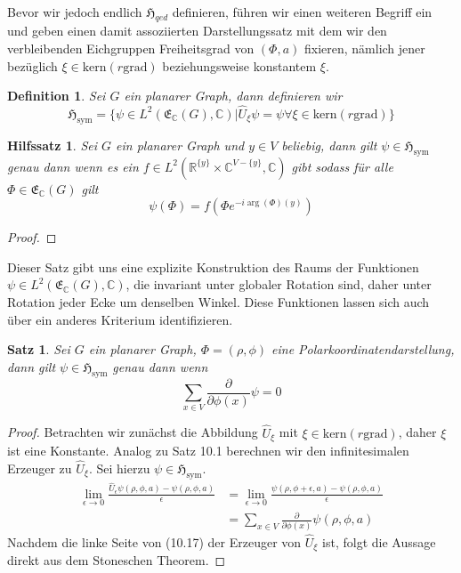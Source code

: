 \documentclass[11pt,a4paper,leqno]{report}
\newtheorem{proposition}{Satz}[chapter]
\newtheorem{lemma}[theorem]{Hilfssatz}
\newtheorem{definition}[theorem]{Definition}
\numberwithin{equation}{chapter}
\begin{document}
\\
Bevor wir jedoch endlich $\mathfrak{H}_{qed}$ definieren, f\"uhren wir einen weiteren Begriff ein und geben einen damit assoziierten Darstellungssatz mit dem wir den verbleibenden Eichgruppen Freiheitsgrad von $(\Phi, a)$ fixieren, nämlich jener  bez\"uglich $\xi\in \text{kern}(r\text{grad})$ beziehungsweise konstantem $\xi$.
\begin{definition}
	Sei $G$ ein planarer Graph, dann definieren wir
	\begin{equation}
		\mathfrak{H}_{\text{sym}}=\{\psi\in L^2(\mathfrak{E}_\mathbb{C}(G), \mathbb{C})| \hat{U}_\xi\psi=\psi \forall \xi\in \text{kern}(r\text{grad})\}
	\end{equation}
\end{definition}
\begin{lemma}
	Sei $G$ ein planarer Graph und $y\in V$ beliebig, dann gilt $\psi\in \mathfrak{H}_{\text{sym}}$ genau dann wenn es ein $f\in L^2(\mathbb{R}^{\{y\}}\times\mathbb{C}^{V-\{y\}}, \mathbb{C})$ gibt sodass f\"ur alle $\Phi\in\mathfrak{E}_\mathbb{C}(G)$ gilt
	\begin{equation}
		\psi(\Phi) = f(\Phi e^{-i\arg(\Phi)(y)})
	\end{equation}
\end{lemma}
\begin{proof}

\end{proof}
\noindent
Dieser Satz gibt uns eine explizite Konstruktion des Raums der Funktionen $\psi\in L^2(\mathfrak{E}_\mathbb{C}(G), \mathbb{C})$, die invariant unter globaler Rotation sind, daher unter Rotation jeder Ecke um denselben Winkel. Diese Funktionen lassen sich auch \"uber ein anderes Kriterium identifizieren.
\begin{proposition}
	Sei $G$ ein planarer Graph, $\Phi = (\rho, \phi)$ eine Polarkoordinatendarstellung, dann gilt $\psi\in \mathfrak{H}_{\text{sym}}$ genau dann wenn
	\begin{equation}
		\sum_{x\in V}\frac{\partial}{\partial \phi(x)}\psi = 0
	\end{equation}
\end{proposition}
\begin{proof}
	Betrachten wir zun\"achst die Abbildung $\hat{U}_\xi$ mit $\xi\in\text{kern}(r\text{grad})$, daher $\xi$ ist eine Konstante. Analog zu Satz 10.1 berechnen wir den infinitesimalen Erzeuger zu $\hat{U}_\xi$. Sei hierzu $\psi\in \mathfrak{H}_{\text{sym}}$.
	\begin{align*}
		\lim_{\epsilon\rightarrow 0}\frac{\hat{U}_\epsilon\psi(\rho, \phi, a)-\psi(\rho, \phi, a)}{\epsilon} &= \lim_{\epsilon\rightarrow 0}\frac{\psi(\rho, \phi +\epsilon, a)-\psi(\rho, \phi, a)}{\epsilon}\\
		&=\sum_{x\in V}\frac{\partial}{\partial \phi(x)}\psi(\rho, \phi, a)
	\end{align*}
	Nachdem die linke Seite von (10.17) der Erzeuger von $\hat{U}_\xi$ ist, folgt die Aussage direkt aus dem Stoneschen Theorem.
\end{proof}
\end{document}
